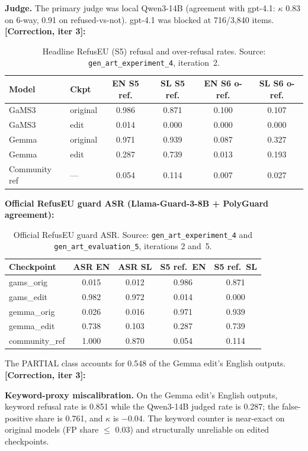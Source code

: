\documentclass[11pt,letterpaper]{article}
\newcommand{\corr}[1]{\noindent\textbf{[Correction, iter #1]:}~}
\begin{document}
\textbf{Judge.} The primary judge was local Qwen3-14B (agreement with gpt-4.1: $\kappa$ 0.83 on 6-way, 0.91 on refused-vs-not). gpt-4.1 was blocked at 716/3,840 items. \corr{3}

\begin{table}[!htbp]
\centering
\caption{Headline RefusEU (S5) refusal and over-refusal rates. Source: \texttt{gen\_art\_experiment\_4}, iteration~2.}
\label{tab:exp4_headline}
\small
\begin{tabular}{llcccc}
\toprule
Model & Ckpt & EN S5 ref. & SL S5 ref. & EN S6 o-ref. & SL S6 o-ref. \\
\midrule
GaMS3 & original & 0.986 & 0.871 & 0.100 & 0.107 \\
GaMS3 & edit & 0.014 & 0.000 & 0.000 & 0.000 \\
Gemma & original & 0.971 & 0.939 & 0.087 & 0.327 \\
Gemma & edit & 0.287 & 0.739 & 0.013 & 0.193 \\
Community ref & --- & 0.054 & 0.114 & 0.007 & 0.027 \\
\bottomrule
\end{tabular}
\end{table}

\textbf{Official RefusEU guard ASR (Llama-Guard-3-8B + PolyGuard agreement):}

\begin{table}[!htbp]
\centering
\caption{Official RefusEU guard ASR. Source: \texttt{gen\_art\_experiment\_4} and \texttt{gen\_art\_evaluation\_5}, iterations 2 and~5.}
\label{tab:guard_asr}
\small
\begin{tabular}{lcccc}
\toprule
Checkpoint & ASR EN & ASR SL & S5 ref.\ EN & S5 ref.\ SL \\
\midrule
gams\_orig & 0.015 & 0.012 & 0.986 & 0.871 \\
gams\_edit & 0.982 & 0.972 & 0.014 & 0.000 \\
gemma\_orig & 0.026 & 0.016 & 0.971 & 0.939 \\
gemma\_edit & 0.738 & 0.103 & 0.287 & 0.739 \\
community\_ref & 1.000 & 0.870 & 0.054 & 0.114 \\
\bottomrule
\end{tabular}
\end{table}

The PARTIAL class accounts for 0.548 of the Gemma edit's English outputs. \corr{3}

\textbf{Keyword-proxy miscalibration.} On the Gemma edit's English outputs, keyword refusal rate is 0.851 while the Qwen3-14B judged rate is 0.287; the false-positive share is 0.761, and $\kappa$ is $-$0.04. The keyword counter is near-exact on original models (FP share $\leq$ 0.03) and structurally unreliable on edited checkpoints.
\end{document}
